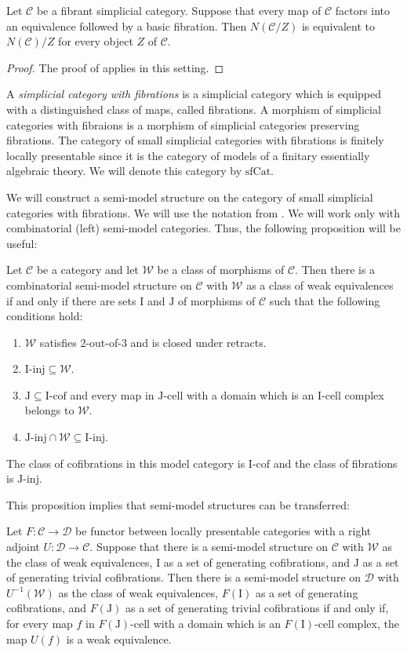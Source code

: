 \documentclass[reqno]{amsart}
\theoremstyle{definition}
\theoremstyle{remark}
\newcommand{\fs}[1]{\mathrm{#1}}
\newcommand{\cat}[1]{\mathcal{#1}}
\newcommand{\C}{\cat{C}}
\newcommand{\D}{\cat{D}}
\newcommand{\sfCat}{\fs{sfCat}}
\newcommand{\I}{\fs{I}}
\newcommand{\J}{\fs{J}}
\newcommand{\we}{\mathcal{W}}
\newcommand{\class}[2]{#1\text{-}\mathrm{#2}}
\newcommand{\Icell}[1][\I]{\class{#1}{cell}}
\newcommand{\Icof}[1][\I]{\class{#1}{cof}}
\newcommand{\Iinj}[1][\I]{\class{#1}{inj}}
\newcommand{\Jcell}[1][]{\Icell[\J#1]}
\newcommand{\Jinj}[1][]{\Iinj[\J#1]}
\numberwithin{figure}{section}
\begin{document}
\begin{prop}
Let $\C$ be a fibrant simplicial category.
Suppose that every map of $\C$ factors into an equivalence followed by a basic fibration.
Then $N(\C/Z)$ is equivalent to $N(\C)/Z$ for every object $Z$ of $\C$.
\end{prop}
\begin{proof}
The proof of \cite[Lemma~6.1.3.13]{lurie-topos} applies in this setting.
\end{proof}

A \emph{simplicial category with fibrations} is a simplicial category which is equipped with a distinguished class of maps, called fibrations.
A morphism of simplicial categories with fibraions is a morphism of simplicial categories preserving fibrations.
The category of small simplicial categories with fibrations is finitely locally presentable since it is the category of models of a finitary essentially algebraic theory.
We will denote this category by $\sfCat$.

We will construct a semi-model structure on the category of small simplicial categories with fibrations.
We will use the notation from \cite{hovey}.
We will work only with combinatorial (left) semi-model categories.
Thus, the following proposition will be useful:

\begin{prop}
Let $\C$ be a category and let $\we$ be a class of morphisms of $\C$.
Then there is a combinatorial semi-model structure on $\C$ with $\we$ as a class of weak equivalences if and only if there are sets $\I$ and $\J$ of morphisms of $\C$ such that the following conditions hold:
\begin{enumerate}
\item $\we$ satisfies 2-out-of-3 and is closed under retracts.
\item $\Iinj \subseteq \we$.
\item $\J \subseteq \Icof$ and every map in $\Jcell$ with a domain which is an $\Icell$ complex belongs to $\we$.
\item $\Jinj \cap \we \subseteq \Iinj$.
\end{enumerate}
The class of cofibrations in this model category is $\Icof$ and the class of fibrations is $\Jinj$.
\end{prop}

This proposition implies that semi-model structures can be transferred:
\begin{prop}
Let $F : \C \to \D$ be functor between locally presentable categories with a right adjoint $U : \D \to \C$.
Suppose that there is a semi-model structure on $\C$ with $\we$ as the class of weak equivalences, $\I$ as a set of generating cofibrations, and $\J$ as a set of generating trivial cofibrations.
Then there is a semi-model structure on $\D$ with $U^{-1}(\we)$ as the class of weak equivalences, $F(\I)$ as a set of generating cofibrations, and $F(\J)$ as a set of generating trivial cofibrations
if and only if, for every map $f$ in $\Icell[F(\J)]$ with a domain which is an $\Icell[F(\I)]$ complex, the map $U(f)$ is a weak equivalence.
\end{prop}
\end{document}
